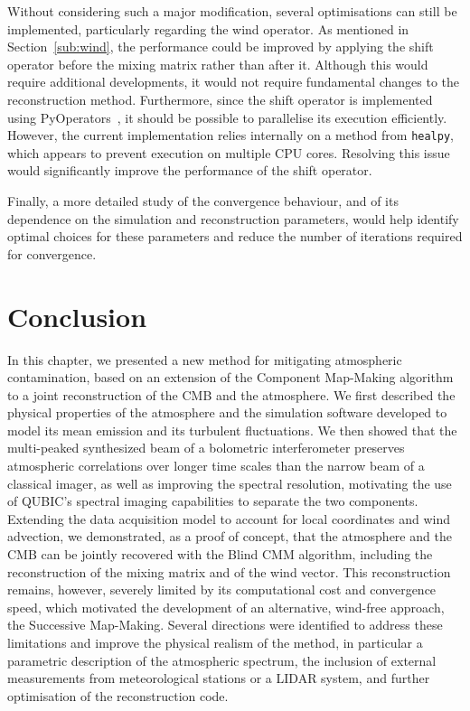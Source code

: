 \documentclass[../../thesis.tex]{subfiles}
\begin{document}
Without considering such a major modification, several optimisations can still be implemented, particularly regarding the wind operator. As mentioned in Section~\ref{sub:wind}, the performance could be improved by applying the shift operator before the mixing matrix rather than after it. Although this would require additional developments, it would not require fundamental changes to the reconstruction method.
Furthermore, since the shift operator is implemented using PyOperators~\cite{PyOperators}, it should be possible to parallelise its execution efficiently. However, the current implementation relies internally on a method from \texttt{healpy}, which appears to prevent execution on multiple CPU cores. Resolving this issue would significantly improve the performance of the shift operator.

Finally, a more detailed study of the convergence behaviour, and of its dependence on the simulation and reconstruction parameters, would help identify optimal choices for these parameters and reduce the number of iterations required for convergence.

\section*{Conclusion}

In this chapter, we presented a new method for mitigating atmospheric contamination, based on an extension of the Component Map-Making algorithm to a joint reconstruction of the CMB and the atmosphere. We first described the physical properties of the atmosphere and the simulation software developed to model its mean emission and its turbulent fluctuations. We then showed that the multi-peaked synthesized beam of a bolometric interferometer preserves atmospheric correlations over longer time scales than the narrow beam of a classical imager, as well as improving the spectral resolution, motivating the use of QUBIC's spectral imaging capabilities to separate the two components. Extending the data acquisition model to account for local coordinates and wind advection, we demonstrated, as a proof of concept, that the atmosphere and the CMB can be jointly recovered with the Blind CMM algorithm, including the reconstruction of the mixing matrix and of the wind vector. This reconstruction remains, however, severely limited by its computational cost and convergence speed, which motivated the development of an alternative, wind-free approach, the Successive Map-Making. Several directions were identified to address these limitations and improve the physical realism of the method, in particular a parametric description of the atmospheric spectrum, the inclusion of external measurements from meteorological stations or a LIDAR system, and further optimisation of the reconstruction code.

\end{document}

